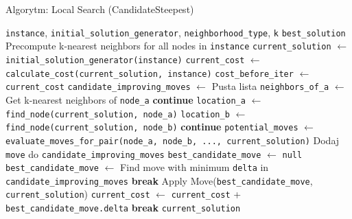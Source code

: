\documentclass[12pt,a4paper]{article}
\begin{document}
\begin{algorithm}[H]
\caption{Algorytm: Local Search (CandidateSteepest)}
\label{alg:candidate}
\begin{algorithmic}[1]
\Require \texttt{instance}, \texttt{initial\_solution\_generator}, \texttt{neighborhood\_type}, \texttt{k}
\Ensure \texttt{best\_solution}
\State Precompute k-nearest neighbors for all nodes in \texttt{instance}
\State \texttt{current\_solution} $\leftarrow$ \texttt{initial\_solution\_generator(instance)}
\State \texttt{current\_cost} $\leftarrow$ \texttt{calculate\_cost(current\_solution, instance)}
\Loop
    \State \texttt{cost\_before\_iter} $\leftarrow$ \texttt{current\_cost}
    \State \texttt{candidate\_improving\_moves} $\leftarrow$ Pusta lista
        \State \texttt{neighbors\_of\_a} $\leftarrow$ Get k-nearest neighbors of \texttt{node\_a}
             \textbf{continue} \EndIf
            \State \texttt{location\_a} $\leftarrow$ \texttt{find\_node(current\_solution, node\_a)}
            \State \texttt{location\_b} $\leftarrow$ \texttt{find\_node(current\_solution, node\_b)}
             \textbf{continue} \EndIf
            \State \texttt{potential\_moves} $\leftarrow$ \texttt{evaluate\_moves\_for\_pair(node\_a, node\_b, ..., current\_solution)}
                    \State Dodaj \texttt{move} do \texttt{candidate\_improving\_moves}
                \EndIf
            \EndFor
        \EndFor
    \EndFor
    \State \texttt{best\_candidate\_move} $\leftarrow$ \texttt{null}
        \State \texttt{best\_candidate\_move} $\leftarrow$ Find move with minimum \texttt{delta} in \texttt{candidate\_improving\_moves}
    \EndIf
        \State \textbf{break} 
    \Else
        \State Apply Move(\texttt{best\_candidate\_move}, \texttt{current\_solution})
        \State \texttt{current\_cost} $\leftarrow$ \texttt{current\_cost} + \texttt{best\_candidate\_move.delta}
    \EndIf
     
        \State \textbf{break}
    \EndIf
\EndLoop
\State \Return \texttt{current\_solution}
\end{algorithmic}
\end{algorithm}
\end{document}
